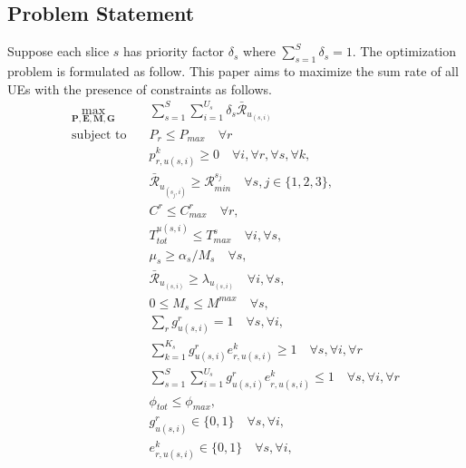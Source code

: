 \documentclass[conference]{IEEEtran}
\begin{document}
\subsection{Problem Statement}
Suppose each slice $s$ has priority factor $\delta_s$ where $\sum_{s=1}^S \delta_s =1$.
The optimization problem is formulated as follow.
This paper aims to maximize the sum rate of all UEs with the presence of constraints as follows.
\begin{subequations}\label{problem}
\begin{alignat}{4}
\max\limits_{\boldsymbol{P}, \boldsymbol{E}, \boldsymbol{M}, \boldsymbol{G} }   \quad &  \sum_{s=1}^{S}\sum_{i=1}^{U_s}\delta_s \bar{\mathcal{R}}_{u_{(s,i)}} \ \\
\text{subject to} \quad  &  P_r \leq P_{max} \quad \forall r
 \label{c11} \\
&p_{r,u(s,i)}^{k}  \geq 0  \quad \forall i,\forall r,\forall s, \forall k,\label{c12} \\
&\bar{\mathcal{R}}_{u_{(s_j,i)}} \geq \mathcal{R}_{min}^{s_j} \quad \forall s, j \in \{1,2,3\}, \label{c13} \\
& C^r \leq C_{max}^r \quad \forall r, \label{c15}\\ 
&T_{tot}^{u(s,i)}  \leq T_{max}^{s} \quad \forall i,\forall s,\label{c16} \\
& \mu_s \geq \alpha_s/M_s \quad \forall s,\label{c16-1} \\
& \bar{\mathcal{R}}_{u_{(s,i)}} \geq {\lambda}_{u_{(s,i)}} \quad \forall i,\forall s,\label{c16-2} \\
& 0 \leq M_s \leq M^{max}  \quad \forall s,\label{c16-3}\\
& \sum_{r}g^r_{u(s,i)} = 1  \quad \forall s,\forall i, \label{c17}  \\
& \sum_{k =1}^{K_s} g^r_{u(s,i)} e^{k}_{r,u(s,i)} \geq 1  \quad \forall s,\forall i ,\forall r \label{c18-1} \\
& \sum_{s =1}^{S}\sum_{i=1}^{U_s}g^r_{u(s,i)} e^{k}_{r,u(s,i)} \leq 1  \quad \forall s,\forall i ,\forall r \label{c18} \\
& \phi_{tot}  \leq \phi_{max}, \label{c19} \\
& g^r_{u(s,i)} \in \{0,1\} \quad \forall s,\forall i, \label{c20}  \\
& e^k_{r,u(s,i)} \in \{0,1\} \quad \forall s,\forall i, \label{c21}  
\end{alignat}
\label{constraints}
\end{subequations}
\end{document}
